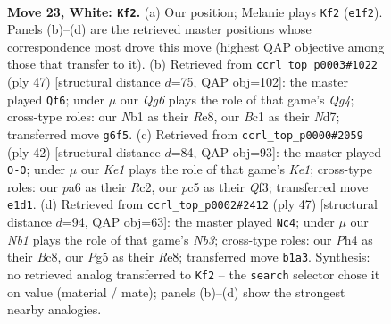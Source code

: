 \documentclass[11pt]{article}
\begin{document}
\clearpage

\begin{figure}[p]\centering
\begin{subfigure}{0.46\textwidth}\centering
\resizebox{\linewidth}{!}{%
\newchessgame
\chessboard[
  setfen={3k2nr/2r3p1/p1qb2Q1/2p3Pp/5P1P/2P5/PP6/RNB1K2R w Q - 1 23},
  showmover=false,
  pgfstyle=straightmove, color=movearrow, markmove={e1-f2}
]}
\caption{}
\end{subfigure}\hfill
\begin{subfigure}{0.46\textwidth}\centering
\resizebox{\linewidth}{!}{%
\newchessgame
\chessboard[
  setfen={4r1k1/r2n1pp1/4p2p/2pP2q1/8/4PP2/2Q2PBP/2RR2K1 b - - 4 24},
  showmover=false,
  pgfstyle=straightmove, color=movearrow, markmove={g5-f6}
]}
\caption{}
\end{subfigure}
\\[4pt]
\begin{subfigure}{0.46\textwidth}\centering
\resizebox{\linewidth}{!}{%
\newchessgame
\chessboard[
  setfen={r1qr2k1/pb3pp1/1p2p1n1/1N6/1PB1P3/P4Q2/2R2PPP/4K2R w K - 2 22},
  showmover=false,
  pgfstyle=straightmove, color=movearrow, markmove={e1-g1}
]}
\caption{}
\end{subfigure}\hfill
\begin{subfigure}{0.46\textwidth}\centering
\resizebox{\linewidth}{!}{%
\newchessgame
\chessboard[
  setfen={2b1r1k1/1r3p1p/pn6/1p1p1pP1/7P/P2Bq3/1PP1N3/1K1RQ1R1 b - - 5 24},
  showmover=false,
  pgfstyle=straightmove, color=movearrow, markmove={b6-c4}
]}
\caption{}
\end{subfigure}
\caption{\textbf{Move 23, White: \texttt{Kf2}.} (a) Our position; Melanie plays \texttt{Kf2} (\texttt{e1f2}). Panels (b)--(d) are the retrieved master positions whose correspondence most drove this move (highest QAP objective among those that transfer to it). (b) Retrieved from \texttt{ccrl\_top\_p0003\#1022} (ply 47) [structural distance $d$=75, QAP obj=102]: the master played \texttt{Qf6}; under $\mu$ our \emph{Qg6} plays the role of that game's \emph{Qg4}; cross-type roles: our \emph{N}b1 as their \emph{R}e8, our \emph{B}c1 as their \emph{N}d7; transferred move \texttt{g6f5}. (c) Retrieved from \texttt{ccrl\_top\_p0000\#2059} (ply 42) [structural distance $d$=84, QAP obj=93]: the master played \texttt{O-O}; under $\mu$ our \emph{Ke1} plays the role of that game's \emph{Ke1}; cross-type roles: our \emph{p}a6 as their \emph{R}c2, our \emph{p}c5 as their \emph{Q}f3; transferred move \texttt{e1d1}. (d) Retrieved from \texttt{ccrl\_top\_p0002\#2412} (ply 47) [structural distance $d$=94, QAP obj=63]: the master played \texttt{Nc4}; under $\mu$ our \emph{Nb1} plays the role of that game's \emph{Nb3}; cross-type roles: our \emph{P}h4 as their \emph{B}c8, our \emph{P}g5 as their \emph{R}e8; transferred move \texttt{b1a3}. Synthesis: no retrieved analog transferred to \texttt{Kf2} -- the \texttt{search} selector chose it on value (material / mate); panels (b)--(d) show the strongest nearby analogies.}
\label{fig:thought-m44}
\end{figure}
\end{document}
